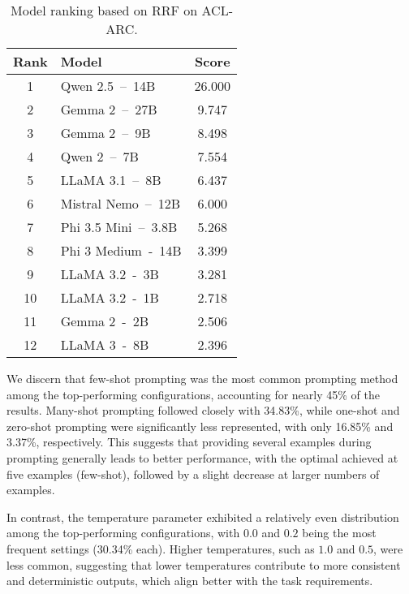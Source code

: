 \begin{table}[t]
    \centering
    \footnotesize
    \begin{tabular}{clc}
      \hline
      \textbf{Rank} &   \textbf{Model}          &   \textbf{Score} \\
      \hline
      1	            &   Qwen 2.5~--~14B         &   26.000         \\
      2	            &   Gemma 2~--~27B          &   9.747          \\
      3	            &   Gemma 2~--~9B           &   8.498          \\
      4	            &   Qwen 2~--~7B            &   7.554          \\
      5	            &   LLaMA 3.1~--~8B         &   6.437          \\
      6	            &   Mistral Nemo~--~12B     &   6.000          \\
      7	            &   Phi 3.5 Mini~--~3.8B    &   5.268          \\
      8	            &   Phi 3 Medium~-~14B      &   3.399          \\
      9             &   LLaMA 3.2~-~3B          &   3.281          \\
      10            &   LLaMA 3.2~-~1B          &   2.718          \\
      11	        &   Gemma 2~-~2B            &   2.506          \\
      12            &   LLaMA 3~-~8B            &   2.396          \\
      \hline
    \end{tabular}
    \caption{Model ranking based on RRF on ACL-ARC.}\label{tab:rrf_evaluation_aclarc}
\end{table}

We discern that few-shot prompting was the most common prompting method among the top-performing configurations, accounting for nearly 45\% of the results. 
Many-shot prompting followed closely with 34.83\%, while one-shot and zero-shot prompting were significantly less represented, with only 16.85\% and 3.37\%, respectively. 
This suggests that providing several examples during prompting generally leads to better performance, with the optimal achieved at five examples (few-shot), followed by a slight decrease at larger numbers of examples.

In contrast, the temperature parameter exhibited a relatively even distribution among the top-performing configurations, with $0.0$ and $0.2$ being the most frequent settings (30.34\% each). Higher temperatures, such as $1.0$ and $0.5$, 
were less common, suggesting that lower temperatures contribute to more consistent and deterministic outputs, 
which align better with the task requirements.

